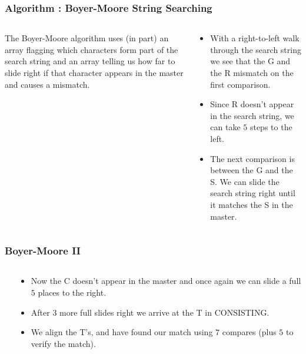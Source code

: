 \begin{frame}[fragile]
\frametitle{Algorithm : Boyer-Moore String Searching}
\begin{columns}[T]

\begin{column}{0.45\textwidth}
The Boyer-Moore algorithm uses (in part) an array flagging
which characters form part of the search string and an array telling
us how far to slide right if that character appears in the master and causes
a mismatch.

\end{column}

\pause
\begin{column}{0.45\textwidth}
\begin{itemize}[<+->]
\item With a right-to-left walk through the search string we see that the G and the R mismatch on the first comparison.
\item Since R doesn't appear in the
search string, we can take $5$ steps to the left.
\item The next comparison is between the G and the S. We can slide the search string right until it matches the S in the master.
\end{itemize}
\end{column}

\end{columns}
\end{frame}


\begin{frame}[fragile]
\frametitle{Boyer-Moore II}
\begin{columns}[T]

\begin{column}{0.45\textwidth}
\end{column}

\begin{column}{0.45\textwidth}
\begin{itemize}[<+->]
\item Now the C doesn't appear in the master and once again we can slide a full $5$ places to the right.
\item After $3$ more full slides right we arrive at the T in CONSISTING.
\item We align the T's, and have found our match using $7$ compares (plus $5$ to verify the match).
\end{itemize}
\end{column}

\end{columns}
\end{frame}


